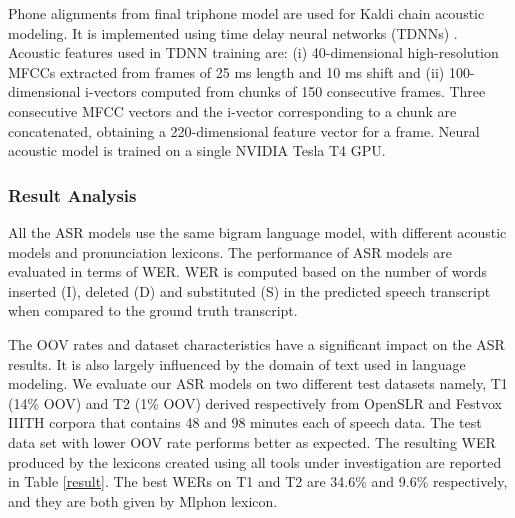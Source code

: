 \documentclass{ieeeaccess}
\begin{document}
Phone alignments from final triphone model are used for Kaldi chain acoustic modeling. It is implemented using time delay neural networks (TDNNs) \cite{peddinti2015time}. Acoustic features used in TDNN training are: (i) 40-dimensional high-resolution MFCCs extracted from frames of 25 ms length and 10 ms shift and (ii) 100-dimensional i-vectors \cite{saon2013speaker} computed from chunks of 150 consecutive frames. Three consecutive MFCC vectors and the i-vector corresponding to a chunk are concatenated, obtaining a 220-dimensional feature vector for a frame. Neural acoustic model is trained on a single NVIDIA Tesla T4 GPU. 





\subsubsection*{Result Analysis }

All the ASR models use the same bigram language model, with different acoustic models and pronunciation lexicons. The performance of  ASR models are evaluated in terms of WER.  WER is computed based on the number of words inserted (I), deleted (D) and substituted (S) in the predicted speech transcript when compared to the ground truth transcript.


The OOV rates and dataset characteristics have a significant impact on the ASR results. It is also largely influenced by the domain of text used in language modeling. We evaluate our ASR models on two different test datasets namely, T1 (14\% OOV) and  T2 (1\% OOV) derived respectively from OpenSLR \cite{he-etal-2020-open} and Festvox IIITH \cite{prahallad2012iiit} corpora that contains 48 and 98 minutes each of speech data. The test data set with lower OOV rate performs better as expected. The resulting WER produced by the lexicons created using all tools under investigation are reported in Table \ref{result}. The best WERs on T1 and T2 are 34.6\% and 9.6\% respectively, and they are both given by Mlphon lexicon.
\end{document}

